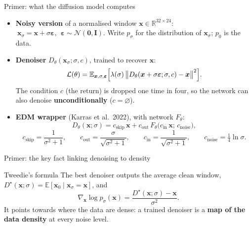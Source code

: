 \documentclass[aspectratio=169,11pt]{beamer}
\newcommand{\R}{\mathbb{R}}
\newcommand{\E}{\mathbb{E}}
\newcommand{\x}{\bm{x}}
\begin{document}
\begin{frame}{Primer: what the diffusion model computes}
\begin{itemize}
\item \textbf{Noisy version} of a normalised window $\x\in\R^{32\times24}$: $\ \x_\sigma=\x+\sigma\bm\varepsilon,\ \ \bm\varepsilon\sim\mathcal N(\bm 0,\bm I)$. Write $p_\sigma$ for the distribution of $\x_\sigma$; $p_0$ is the data.
\item \textbf{Denoiser} $D_\theta(\x_\sigma;\sigma,c)$, trained to recover $\x$:
\[
\mathcal L(\theta)=\E_{\x,\sigma,\bm\varepsilon}\Bigl[\lambda(\sigma)\,\bigl\lVert D_\theta(\x+\sigma\bm\varepsilon;\sigma,c)-\x\bigr\rVert^2\Bigr].
\]
The condition $c$ (the return) is dropped one time in four, so the network can also denoise \textbf{unconditionally} ($c=\varnothing$).
\item \textbf{EDM wrapper} (Karras et al.\ 2022), with network $F_\theta$:
\[
D_\theta(\x;\sigma)=c_{\text{skip}}\,\x+c_{\text{out}}\,F_\theta\bigl(c_{\text{in}}\,\x;\,c_{\text{noise}}\bigr),
\]
\[
c_{\text{skip}}=\frac{1}{\sigma^2+1},\qquad c_{\text{out}}=\frac{\sigma}{\sqrt{\sigma^2+1}},\qquad c_{\text{in}}=\frac{1}{\sqrt{\sigma^2+1}},\qquad c_{\text{noise}}=\tfrac14\ln\sigma.
\]
\end{itemize}
\end{frame}

\begin{frame}{Primer: the key fact linking denoising to density}
\begin{block}{Tweedie's formula}
The best denoiser outputs the average clean window, $D^\star(\x;\sigma)=\E[\x_0\mid\x_\sigma=\x]$, and
\[
\nabla_{\x}\log p_\sigma(\x)=\frac{D^\star(\x;\sigma)-\x}{\sigma^2}.
\]
It points towards where the data are dense: a trained denoiser is a \textbf{map of the data density} at every noise level.
\end{block}
\end{frame}
\end{document}
